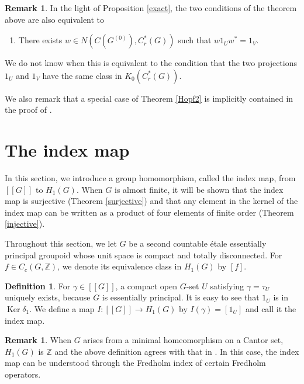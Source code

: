 \documentclass[11pt]{article}
\theoremstyle{definition}
\newtheorem{df}[thm]{Definition}
\newtheorem{rem}[thm]{Remark}
\renewcommand{\ker}{\operatorname{Ker}}
\newcommand{\Z}{\mathbb{Z}}
\begin{document}
\begin{rem}
In the light of Proposition \ref{exact}, 
the two conditions of the theorem above are also equivalent to 
\begin{enumerate}
\item[(3)] There exists $w\in N(C(G^{(0)}),C^*_r(G))$ such that 
$w1_Uw^*=1_V$. 
\end{enumerate}
We do not know when this is equivalent to the condition that 
the two projections $1_U$ and $1_V$ have the same class in $K_0(C^*_r(G))$. 
\end{rem}

We also remark that 
a special case of Theorem \ref{Hopf2} is implicitly contained 
in the proof of \cite[Theorem 3.16]{LaO}. 




\section{The index map}

In this section, 
we introduce a group homomorphism, called the index map, 
from $[[G]]$ to $H_1(G)$. 
When $G$ is almost finite, it will be shown that 
the index map is surjective (Theorem \ref{surjective}) and 
that any element in the kernel of the index map can be written 
as a product of four elements of finite order (Theorem \ref{injective}). 

Throughout this section, 
we let $G$ be a second countable \'etale essentially principal groupoid 
whose unit space is compact and totally disconnected. 
For $f\in C_c(G,\Z)$, 
we denote its equivalence class in $H_1(G)$ by $[f]$. 

\begin{df}
For $\gamma\in[[G]]$, 
a compact open $G$-set $U$ satisfying $\gamma=\tau_U$ uniquely exists, 
because $G$ is essentially principal. 
It is easy to see that $1_U$ is in $\ker\delta_1$. 
We define a map $I:[[G]]\to H_1(G)$ by $I(\gamma)=[1_U]$ 
and call it the index map. 
\end{df}

\begin{rem}
When $G$ arises from a minimal homeomorphism on a Cantor set, 
$H_1(G)$ is $\Z$ and 
the above definition agrees with that in \cite[Section 5]{GPS2}. 
In this case, the index map can be understood 
through the Fredholm index of certain Fredholm operators. 
\end{rem}
\end{document}
